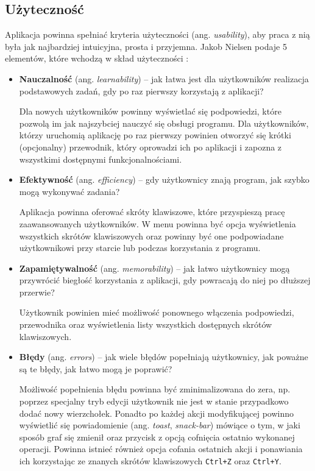 \subsection{Użyteczność}

Aplikacja powinna spełniać kryteria użyteczności (ang. \textit{usability}), aby praca z nią była jak najbardziej intuicyjna, prosta i przyjemna. Jakob Nielsen podaje 5 elementów, które wchodzą w skład użyteczności \cite{nielsen}:

\begin{itemize}
\setlength\itemsep{1em}
\item \textbf{Nauczalność} (ang. \textit{learnability}) -- jak łatwa jest dla użytkowników realizacja podstawowych zadań, gdy po raz pierwszy korzystają z aplikacji? 

Dla nowych użytkowników powinny wyświetlać się podpowiedzi, które pozwolą im jak najszybciej nauczyć się obsługi programu. Dla użytkowników, którzy uruchomią aplikację po raz pierwszy powinien otworzyć się krótki (opcjonalny) przewodnik, który oprowadzi ich po aplikacji i zapozna z wszystkimi dostępnymi funkcjonalnościami.

\item \textbf{Efektywność} (ang. \textit{efficiency}) -- gdy użytkownicy znają program, jak szybko mogą wykonywać zadania?

Aplikacja powinna oferować skróty klawiszowe, które przyspieszą pracę zaawansowanych użytkowników. W menu powinna być opcja wyświetlenia wszystkich skrótów klawiszowych oraz powinny być one podpowiadane użytkownikowi przy starcie lub podczas korzystania z programu.

\item \textbf{Zapamiętywalność} (ang. \textit{memorability}) -- jak łatwo użytkownicy mogą przywrócić biegłość korzystania z aplikacji, gdy powracają do niej po dłuższej przerwie?

Użytkownik powinien mieć możliwość ponownego włączenia podpowiedzi, przewodnika oraz wyświetlenia listy wszystkich dostępnych skrótów klawiszowych. 

\item \textbf{Błędy} (ang. \textit{errors}) -- jak wiele błędów popełniają użytkownicy, jak poważne są te błędy, jak łatwo mogą je poprawić?

Możliwość popełnienia błędu powinna być zminimalizowana do zera, np. poprzez specjalny tryb edycji użytkownik nie jest w stanie przypadkowo dodać nowy wierzchołek. Ponadto po każdej akcji modyfikującej powinno wyświetlić się powiadomienie (ang. \textit{toast}, \textit{snack-bar}) mówiące o tym, w jaki sposób graf się zmienił oraz przycisk z opcją cofnięcia ostatnio wykonanej operacji. Powinna istnieć również opcja cofania ostatnich akcji i ponawiania ich korzystając ze znanych skrótów klawiszowych \texttt{Ctrl+Z} oraz \texttt{Ctrl+Y}. 


\end{itemize}
